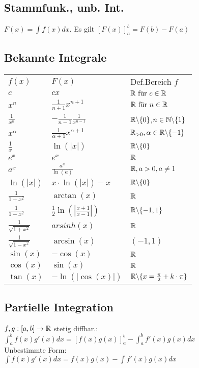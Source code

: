 \subsection*{Stammfunk., unb. Int.}
$F(x) = \int f(x) dx$. Es gilt $[F(x)]_a^b = F(b) - F(a)$
\subsection*{Bekannte Integrale}
\begin{adjustwidth}{-1.2em}{}
\begin{tabular}[leftmargin=*]{p{2em}p{4.6em}p{10em}}
     $f(x)$ & $F(x)$ & Def.Bereich $f$ \\
     $c$ & $cx$ & $\mathbb R \text{ für } c\in \mathbb R$ \\
     $x^n$ & $\frac{1}{n+1} x^{n +1}$ & $\mathbb R \text{ für } n \in \mathbb R$ \\
     $\frac{1}{x^n}$ & $- \frac{1}{n-1} \frac{1}{x^{n-1}}$ & $\mathbb R \backslash \{0\}$,$n \in \mathbb N\backslash\{1\}$ \\
     $x^\alpha$ & $\frac{1}{\alpha + 1} x^{\alpha + 1}$ & $\mathbb R_{>0}, \alpha \in \mathbb R\backslash\{-1\}$ \\
     $\frac{1}{x}$ & $\ln(|x|)$ & $\mathbb R\backslash\{0\}$ \\
     $e^x$ & $e^x$ & $\mathbb R$ \\
     $a^x$ & $\frac{a^x}{\ln(a)}$ & $\mathbb R, a > 0, a \neq 1$ \\
     $\ln(|x|)$ & $x \cdot \ln(|x|) - x$ & $\mathbb R\backslash\{0\}$ \\
     $\frac{1}{1 + x^2}$ & $\arctan(x)$ & $\mathbb R$ \\
     $\frac{1}{1 - x^2}$ & $\frac{1}{2}\ln(|\frac{x + 1}{x - 1}|)$ & $\mathbb R\backslash\{-1, 1\}$ \\
     $\frac{1}{\sqrt{1 + x^2}}$ & $arsinh(x)$ & $\mathbb R$ \\
     $\frac{1}{\sqrt{1 - x^2}}$ & $\arcsin(x)$ & $(-1, 1)$ \\
     $\sin(x)$ & $-\cos(x)$ & $\mathbb R$ \\
     $\cos(x)$ & $\sin(x)$ & $\mathbb R$ \\
     $\tan(x)$ & $- \ln (|\cos(x)|)$ & $\mathbb R\backslash\{x = \frac{\pi}{2} + k \cdot \pi\}$ \\
\end{tabular}
\end{adjustwidth}
\subsection*{Partielle Integration}
$f, g:[a, b]\rightarrow \mathbb R$ stetig diffbar.:\\
$\int_a^b f(x) g'(x) dx = [f(x) g(x)]_a^b - \int_a ^b f'(x) g(x) dx$\\
Unbestimmte Form: \\
$\int f(x) g'(x) dx = f(x) g(x) - \int f'(x) g(x) dx$
